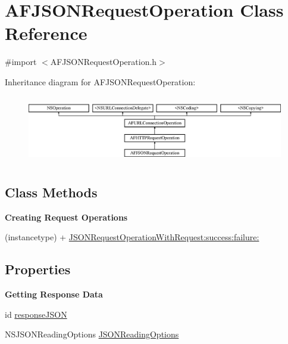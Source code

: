 \hypertarget{interface_a_f_j_s_o_n_request_operation}{\section{A\-F\-J\-S\-O\-N\-Request\-Operation Class Reference}
\label{interface_a_f_j_s_o_n_request_operation}
}


{\ttfamily \#import $<$A\-F\-J\-S\-O\-N\-Request\-Operation.\-h$>$}

Inheritance diagram for A\-F\-J\-S\-O\-N\-Request\-Operation\-:\begin{figure}[H]
\begin{center}
\leavevmode
\includegraphics[height=2.978724cm]{interface_a_f_j_s_o_n_request_operation}
\end{center}
\end{figure}
\subsection*{Class Methods}
\begin{Indent}{\bf Creating Request Operations}\par
{\em 

 

 }\begin{DoxyCompactItemize}
\item 
(instancetype) + \hyperlink{interface_a_f_j_s_o_n_request_operation_a89042addd43aacda57f24036359bdb09}{J\-S\-O\-N\-Request\-Operation\-With\-Request\-:success\-:failure\-:}
\end{DoxyCompactItemize}
\end{Indent}
\subsection*{Properties}
\begin{Indent}{\bf Getting Response Data}\par
{\em 

 

 }\begin{DoxyCompactItemize}
\item 
id \hyperlink{interface_a_f_j_s_o_n_request_operation_a1bc9c9b08f780373ace7eb34b1ae8149}{response\-J\-S\-O\-N}
\item 
N\-S\-J\-S\-O\-N\-Reading\-Options \hyperlink{interface_a_f_j_s_o_n_request_operation_a18f86ed904ccb70223a950ae5449a45b}{J\-S\-O\-N\-Reading\-Options}
\end{DoxyCompactItemize}
\end{Indent}
